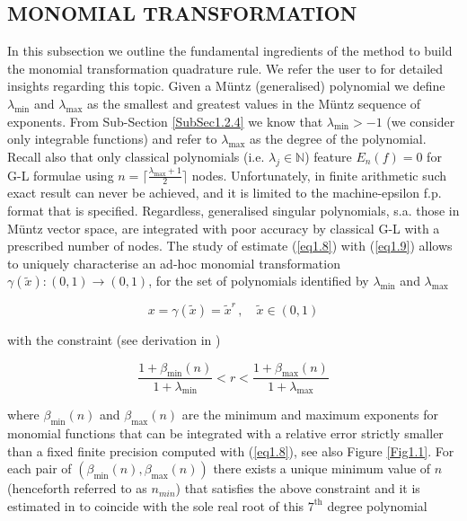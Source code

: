 \documentclass[a4paper, twosided]{book}
\begin{document}
\subsection[Monomial transformation]{\changefont MONOMIAL TRANSFORMATION}\label{SubSec1.2.6}

In this subsection we outline the fundamental ingredients of the method to build the monomial transformation quadrature rule. We refer the user to \cite{Lombardi09,Lombardi21} for detailed insights regarding this topic. Given a Müntz (generalised) polynomial we define $\lambda_{\text{min}}$ and $\lambda_{\text{max}}$ as the smallest and greatest values in the Müntz sequence of exponents. From Sub-Section \ref{SubSec1.2.4} we know that $\lambda_{\text{min}}>-1$ (we consider only integrable functions) and refer to $\lambda_{\text{max}}$ as the degree of the polynomial. Recall also that only classical polynomials (i.e. $\lambda_j\in\mathbb{N}$) feature $E_n(f)=0$ for G-L formulae using $n = \lceil \frac{\lambda_{\text{max}}+1}{2} \rceil$ nodes. Unfortunately, in finite arithmetic such exact result can never be achieved, and it is limited to the machine-epsilon f.p. format that is specified. Regardless, generalised singular polynomials, s.a. those in Müntz vector space, are integrated with poor accuracy by classical G-L with a prescribed number of nodes. The study of estimate (\ref{eq1.8}) with (\ref{eq1.9}) allows to uniquely characterise an ad-hoc monomial transformation $\gamma(\tilde{x}):(0,1)\to(0,1)$, for the set of polynomials identified by $\lambda_{\text{min}}$ and $\lambda_{\text{max}}$

\begin{equation}\label{eq1.16}
    x = \gamma(\tilde{x}) = \tilde{x}^r\,,\quad\tilde{x}\in(0,1)
\end{equation}

\noindent
with the constraint (see derivation in \cite{Lombardi09, Lombardi21})

\begin{equation}\label{eq1.17}
    \frac{1+\beta_{\text{min}}(n)}{1+\lambda_{\text{min}}} < r < \frac{1+\beta_{\text{max}}(n)}{1+\lambda_{\text{max}}}
\end{equation}

\noindent
where $\beta_{\text{min}}(n)$ and $\beta_{\text{max}}(n)$ are the minimum and maximum exponents for monomial functions that can be integrated with a relative error strictly smaller than a fixed finite precision computed with (\ref{eq1.8}), see also Figure \ref{Fig1.1}. For each pair of $(\beta_{\text{min}}(n),\beta_{\text{max}}(n))$ there exists a unique minimum value of $n$ (henceforth referred to as $n_{min}$) that satisfies the above constraint and it is estimated  in \cite{Lombardi09,Lombardi21} to coincide with the sole real root of this $7^{\text{th}}$ degree polynomial
\end{document}
